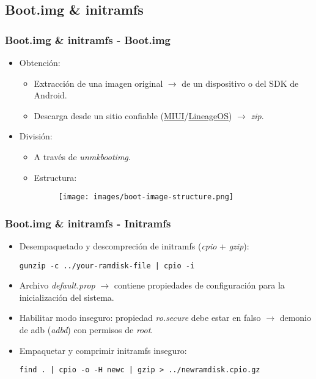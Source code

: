 \subsection{Boot.img \& initramfs}
\begin{frame}
  \frametitle{Boot.img \& initramfs - Boot.img}
  \begin{itemize}
      \item Obtención:
      \begin{itemize}
	  \item Extracción de una imagen original $\rightarrow$ de un dispositivo o del SDK de Android.

	  \item Descarga desde un sitio confiable (\href{http://en.miui.com/}{MIUI}/\href{https://lineageos.org/}{LineageOS}) $\rightarrow$ \textit{zip}.
      \end{itemize}
      
      \item División:
      \begin{itemize}
	  \item A través de \textit{unmkbootimg}.
      
	  \item Estructura:
	  \begin{figure}
	    \texttt{[image: images/boot-image-structure.png]}
	  \end{figure}
      \end{itemize}
  \end{itemize}
\end{frame}

\begin{frame}[fragile]
  \frametitle{Boot.img \& initramfs - Initramfs}
  \begin{itemize}
      \item Desempaquetado y descompreción de initramfs (\textit{cpio} + \textit{gzip}):

      \begin{lstlisting}
gunzip -c ../your-ramdisk-file | cpio -i
      \end{lstlisting}

      \item Archivo \textit{default.prop} $\rightarrow$ contiene propiedades de configuración para la inicialización del sistema.

      \item Habilitar modo inseguro: propiedad \textit{ro.secure} debe estar en falso $\rightarrow$ demonio de adb (\textit{adbd}) con permisos de \textit{root}.
      
      \item Empaquetar y comprimir initramfs inseguro:

      \begin{lstlisting}
find . | cpio -o -H newc | gzip > ../newramdisk.cpio.gz
      \end{lstlisting}

  \end{itemize}
\end{frame}

